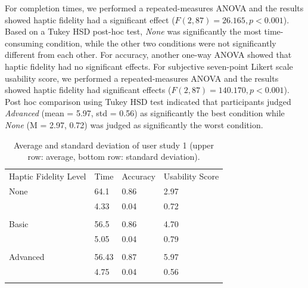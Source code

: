 \documentclass{svjour3}                     %
\begin{document}
For completion times, we performed a repeated-measures ANOVA and the results showed haptic fidelity had a significant effect ($F(2, 87) = 26.165, p < 0.001$).
%
Based on a Tukey HSD post-hoc test, \textit{None} was significantly the most time-consuming condition, while the other two conditions were not significantly different from each other.
For accuracy, another one-way ANOVA showed that haptic fidelity had no significant effects.
For subjective seven-point Likert scale usability score, we performed a repeated-measures ANOVA and the results showed haptic fidelity had significant effects ($F(2, 87) = 140.170, p < 0.001$).
%
Post hoc comparison using Tukey HSD test indicated that participants judged \textit{Advanced} (mean = 5.97, std = 0.56) as significantly the best condition while \textit{None} (M = 2.97, 0.72) was judged as significantly the worst condition.

\begin{table}
\caption{Average and standard deviation of user study 1 (upper row: average, bottom row: standard deviation).}
\label{tab:r1}       %
\begin{tabular}{llll}
\hline\noalign{\smallskip}
Haptic Fidelity Level & Time & Accuracy & Usability Score\\
\noalign{\smallskip}\hline\noalign{\smallskip}
None & 64.1 & 0.86 & 2.97 \\
 & 4.33 & 0.04 & 0.72 \\\\
Basic & 56.5 & 0.86 & 4.70 \\
 & 5.05 & 0.04 & 0.79 \\\\
Advanced & 56.43 & 0.87 & 5.97 \\
 & 4.75 & 0.04 & 0.56 \\
\noalign{\smallskip}\hline
\end{tabular}
\end{table}
\end{document}
